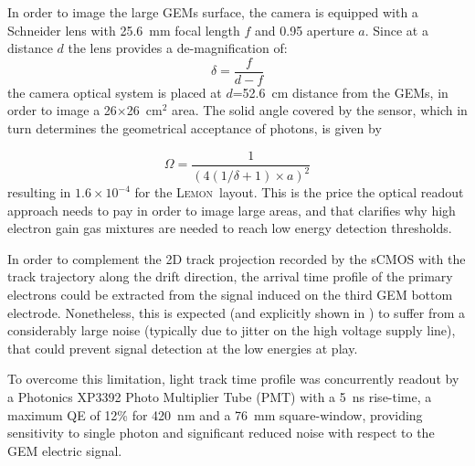 \documentclass[physics,article,submit,moreauthors,pdftex]{Definitions/mdpi}
\newcommand{\lemon}{{\textsc{Lemon}}\xspace}
\begin{document}
In order to image the large GEMs surface, the camera is equipped with a Schneider lens with 25.6~mm focal length $f$ and 0.95 aperture $a$. Since at a distance $d$ the lens provides a de-magnification of:
\begin{equation}
\label{eq:demagnification}
 \delta = \frac{f}{d-f} 
\end{equation}
the camera optical system is placed at $d$=52.6~cm distance from the GEMs, in order to image a 26$\times$26~cm$^2$ area. The solid angle covered by the sensor, which in turn determines the geometrical acceptance of photons, is given by

$$
\label{eq:omega}
\Omega = \frac{1}{\left(4(1/\delta+1)\times a \right)^2}
$$
resulting in $1.6 \times 10^{-4}$ for the \lemon\ layout. This is the price the optical readout approach needs to pay in order to image large areas, and that clarifies why high electron gain gas mixtures are needed to reach low energy detection thresholds.





In order to complement the 2D track projection recorded by the sCMOS with the track trajectory along the drift direction, the arrival time profile of the primary electrons could be extracted from the signal induced on the third GEM bottom electrode. Nonetheless, this is expected (and explicitly shown in \cite{bib:jinst_orange2}) to suffer from a considerably large 
noise (typically due to jitter on the high voltage
supply line), that could prevent signal detection at the low energies at play.

To overcome this limitation, light track time profile was concurrently readout by a Photonics XP3392 Photo Multiplier Tube (PMT) with a 5~ns rise-time, a maximum QE of 12\% for 420~nm and a 76~mm square-window, providing sensitivity to single photon and significant reduced noise with respect to the GEM electric signal. 

\end{document}
